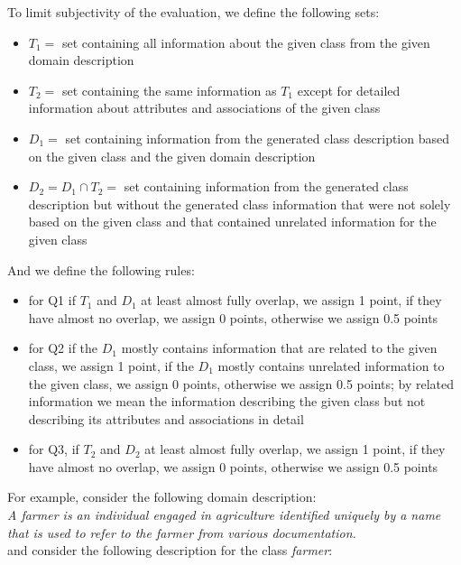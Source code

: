 \noindent{}To limit subjectivity of the evaluation, we define the following sets:

\begin{itemize}
\item $T_1 =$ set containing all information about the given class from the given domain description
\item $T_2 =$ set containing the same information as $T_1$ except for detailed information about attributes and associations of the given class
\item $D_1 =$ set containing information from the generated class description based on the given class and the given domain description
\item $D_2 = D_1 \cap T_2 =$ set containing information from the generated class description but without the generated class information that were not solely based on the given class and that contained unrelated information for the given class
\end{itemize}

\noindent{}And we define the following rules:
\begin{itemize}
\item for Q1 if $T_1$ and $D_1$ at least almost fully overlap, we assign 1 point, if they have almost no overlap, we assign 0 points, otherwise we assign 0.5 points
\item for Q2 if the $D_1$ mostly contains information that are related to the given class, we assign 1 point, if the $D_1$ mostly contains unrelated information to the given class, we assign 0 points, otherwise we assign 0.5 points; by related information we mean the information describing the given class but not describing its attributes and associations in detail
\item for Q3, if $T_2$ and $D_2$ at least almost fully overlap, we assign 1 point, if they have almost no overlap, we assign 0 points, otherwise we assign 0.5 points
\end{itemize}


\noindent{}For example, consider the following domain description: \\

\noindent{}\textit{A farmer is an individual engaged in agriculture identified uniquely by a name that is used to refer to the farmer from various documentation.} \\

\noindent{}and consider the following description for the class \textit{farmer}: \\


